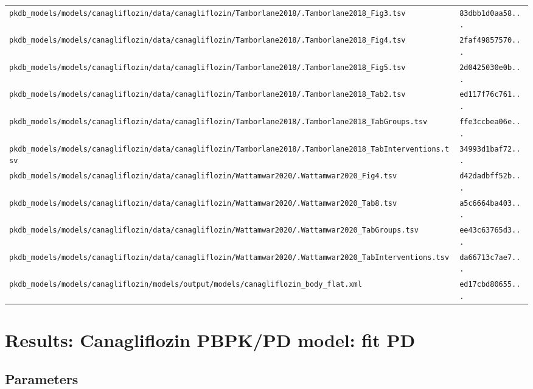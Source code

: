 \documentclass{article}
\begin{document}
\begin{longtable}{ll}
\texttt{pkdb\_models/models/canagliflozin/data/canagliflozin/Tamborlane2018/.Tamborlane2018\_Fig3.tsv} & \texttt{83dbb1d0aa58...} \\
\texttt{pkdb\_models/models/canagliflozin/data/canagliflozin/Tamborlane2018/.Tamborlane2018\_Fig4.tsv} & \texttt{2faf49857570...} \\
\texttt{pkdb\_models/models/canagliflozin/data/canagliflozin/Tamborlane2018/.Tamborlane2018\_Fig5.tsv} & \texttt{2d0425030e0b...} \\
\texttt{pkdb\_models/models/canagliflozin/data/canagliflozin/Tamborlane2018/.Tamborlane2018\_Tab2.tsv} & \texttt{ed117f76c761...} \\
\texttt{pkdb\_models/models/canagliflozin/data/canagliflozin/Tamborlane2018/.Tamborlane2018\_TabGroups.tsv} & \texttt{ffe3ccbea06e...} \\
\texttt{pkdb\_models/models/canagliflozin/data/canagliflozin/Tamborlane2018/.Tamborlane2018\_TabInterventions.tsv} & \texttt{34993d1baf72...} \\
\texttt{pkdb\_models/models/canagliflozin/data/canagliflozin/Wattamwar2020/.Wattamwar2020\_Fig4.tsv} & \texttt{d42dadbff52b...} \\
\texttt{pkdb\_models/models/canagliflozin/data/canagliflozin/Wattamwar2020/.Wattamwar2020\_Tab8.tsv} & \texttt{a5c6664ba403...} \\
\texttt{pkdb\_models/models/canagliflozin/data/canagliflozin/Wattamwar2020/.Wattamwar2020\_TabGroups.tsv} & \texttt{ee43c63765d3...} \\
\texttt{pkdb\_models/models/canagliflozin/data/canagliflozin/Wattamwar2020/.Wattamwar2020\_TabInterventions.tsv} & \texttt{da66713c7ae7...} \\
\texttt{pkdb\_models/models/canagliflozin/models/output/models/canagliflozin\_body\_flat.xml} & \texttt{ed17cbd80655...} \\
\end{longtable}

\section{Results: Canagliflozin PBPK/PD model: fit PD}

\subsection{Parameters}
\end{document}
